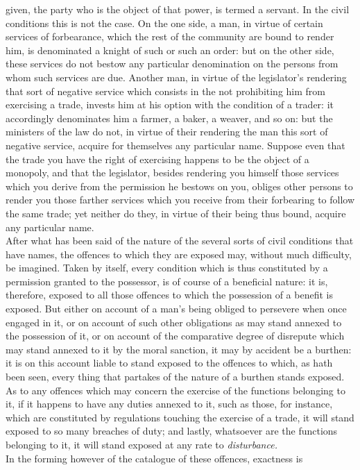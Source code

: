 \documentclass[12pt]{report}
\begin{document}
given, the party who is the object of that power, is termed a servant.
In the civil conditions this is not the case. On the one side, a man, in
virtue of certain services of forbearance, which the rest of the
community are bound to render him, is denominated a knight of such or
such an order: but on the other side, these services do not bestow any
particular denomination on the persons from whom such services are due.
Another man, in virtue of the legislator's rendering that sort of
negative service which consists in the not prohibiting him from
exercising a trade, invests him at his option with the condition of a
trader: it accordingly denominates him a farmer, a baker, a weaver, and
so on: but the ministers of the law do not, in virtue of their rendering
the man this sort of negative service, acquire for themselves any
particular name. Suppose even that the trade you have the right of
exercising happens to be the object of a monopoly, and that the
legislator, besides rendering you himself those services which you
derive from the permission he bestows on you, obliges other persons to
render you those farther services which you receive from their
forbearing to follow the same trade; yet neither do they, in virtue of
their being thus bound, acquire any particular name.\\
After what has been said of the nature of the several sorts of civil
conditions that have names, the offences to which they are exposed may,
without much difficulty, be imagined. Taken by itself, every condition
which is thus constituted by a permission granted to the possessor, is
of course of a beneficial nature: it is, therefore, exposed to all those
offences to which the possession of a benefit is exposed. But either on
account of a man's being obliged to persevere when once engaged in it,
or on account of such other obligations as may stand annexed to the
possession of it, or on account of the comparative degree of disrepute
which may stand annexed to it by the moral sanction, it may by accident
be a burthen: it is on this account liable to stand exposed to the
offences to which, as hath been seen, every thing that partakes of the
nature of a burthen stands exposed. As to any offences which may concern
the exercise of the functions belonging to it, if it happens to have any
duties annexed to it, such as those, for instance, which are constituted
by regulations touching the exercise of a trade, it will stand exposed
to so many breaches of duty; and lastly, whatsoever are the functions
belonging to it, it will stand exposed at any rate to
\emph{disturbance.} \emph{\\
}In the forming however of the catalogue of these offences, exactness is
\end{document}
